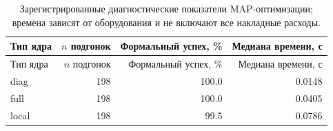 \begin{longtable}{lrrr}
\caption{Зарегистрированные диагностические показатели MAP-оптимизации; времена зависят от оборудования и не включают все накладные расходы.}\label{tab:optimizer}\\
\toprule
Тип ядра & $n$ подгонок & Формальный успех, \% & Медиана времени, с \\
\midrule
\endfirsthead
\toprule
Тип ядра & $n$ подгонок & Формальный успех, \% & Медиана времени, с \\
\midrule
\endhead
diag & 198 & 100.0 & 0.0148 \\
full & 198 & 100.0 & 0.0405 \\
local & 198 & 99.5 & 0.0786 \\
\bottomrule
\end{longtable}
